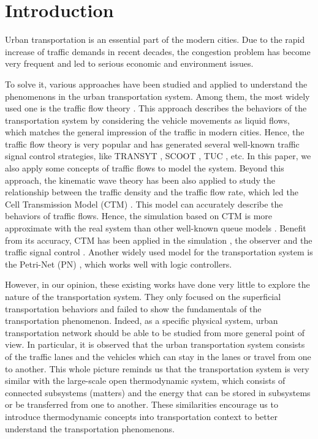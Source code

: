 \documentclass[preprint,authoryear,12pt]{elsarticle}
\begin{document}
\section{Introduction}

Urban transportation is an essential part of the modern cities. Due to the rapid increase of traffic demands in recent decades, the congestion problem has become very frequent and led to serious economic and environment issues.

To solve it, various approaches have been studied and applied to understand the phenomenons in the urban transportation system. Among them, the most widely used one is the traffic flow theory \citep{nathan_h_gartner_revised_2005}. This approach describes the behaviors of the transportation system by considering the vehicle movements as liquid flows, which matches the general impression of the traffic in modern cities. Hence, the traffic flow theory is very popular and has generated several well-known traffic signal control strategies, like TRANSYT \citep{robertson_tansyt_1969,hale_traffic_2005}, SCOOT \citep{bretherton_r_d_scoot_1982}, TUC \citep{diakaki_multivariable_2002}, etc. In this paper, we also apply some concepts of traffic flows to model the system. Beyond this approach, the kinematic wave theory has been also applied to study the relationship between the traffic density and the traffic flow rate, which led the Cell Transmission Model (CTM) \citep{daganzo_cell_1995,flotterod_operational_2011}. This 
model can accurately describe the behaviors of traffic flows. Hence, the simulation based on CTM is more approximate with the real system than other well-known queue models \citep{almasri_online_2005}. Benefit from its accuracy, CTM has been applied in the simulation \citep{Su2013}, the observer \citep{CanudasdeWit2012} and the traffic signal control \citep{Pohlmann2010}. Another widely used model for the transportation system is the Petri-Net (PN) \citep{dotoli_urban_2006,ng_review_2013}, which works well with logic controllers.

However, in our opinion, these existing works have done very little to explore the nature of the transportation system. They only focused on the superficial transportation behaviors and failed to show the fundamentals of the transportation phenomenon. Indeed, as a specific physical system, urban transportation network should be able to be studied from more general point of view. In particular, it is observed that the urban transportation system consists of the traffic lanes and the vehicles which can stay in the lanes or travel from one to another. This whole picture reminds us that the transportation system is very similar with the large-scale open thermodynamic system, which consists of connected subsystems (matters) and the energy that can be stored in subsystems or be transferred from one to another. These similarities encourage us to introduce thermodynamic concepts into transportation context to better understand the transportation phenomenons.
\end{document}
